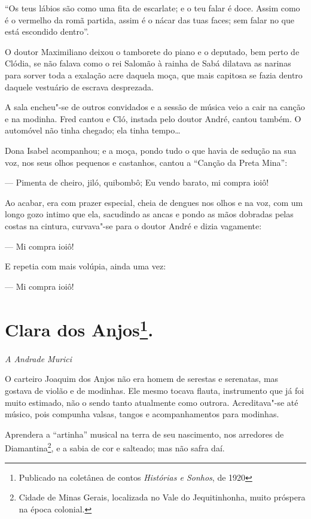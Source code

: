 ``Os teus lábios são como uma fita de escarlate; e o teu falar é doce.
Assim como é o vermelho da romã partida, assim é o nácar das tuas faces;
sem falar no que está escondido dentro''.

O doutor Maximiliano deixou o tamborete do piano e o deputado, bem perto
de Clódia, se não falava como o rei Salomão à rainha de Sabá dilatava as
narinas para sorver toda a exalação acre daquela moça, que mais capitosa
se fazia dentro daquele vestuário de escrava desprezada.

A sala encheu"-se de outros convidados e a sessão de música veio a cair
na canção e na modinha. Fred cantou e Cló, instada pelo doutor André,
cantou também. O automóvel não tinha chegado; ela tinha tempo\ldots{}

Dona Isabel acompanhou; e a moça, pondo tudo o que havia de sedução na
sua voz, nos seus olhos pequenos e castanhos, cantou a ``Canção da Preta
Mina'':

--- Pimenta de cheiro, jiló, quibombô; Eu vendo barato, mi compra ioiô!

Ao acabar, era com prazer especial, cheia de dengues nos olhos e na voz,
com um longo gozo intimo que ela, sacudindo as ancas e pondo as mãos
dobradas pelas costas na cintura, curvava"-se para o doutor André e dizia
vagamente:

--- Mi compra ioiô!

E repetia com mais volúpia, ainda uma vez:

--- Mi compra ioiô!


\chapter[Clara dos Anjos]{Clara dos Anjos\footnote[*]{Publicado na coletânea de contos \emph{Histórias e Sonhos}, de 1920}.}

\hfill\emph{A Andrade Murici}\bigskip

\noindent{}O carteiro Joaquim dos Anjos não era homem de serestas e serenatas, mas
gostava de violão e de modinhas. Ele mesmo tocava flauta, instrumento
que já foi muito estimado, não o sendo tanto atualmente como outrora.
Acreditava"-se até músico, pois compunha valsas, tangos e acompanhamentos
para modinhas.

Aprendera a ``artinha'' musical na terra de seu nascimento, nos arredores
de Diamantina\footnote{Cidade de Minas Gerais, localizada no Vale do
  Jequitinhonha, muito próspera na época colonial.}, e a sabia de cor e
salteado; mas não safra daí.

